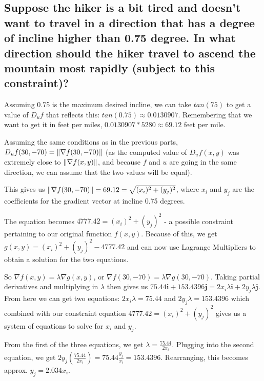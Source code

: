 \documentclass{article}
\begin{document}
\subsection{Suppose the hiker is a bit tired and doesn’t want to travel in a direction that has a degree of incline higher than 0.75 degree. In what direction should the hiker travel to ascend the mountain most rapidly (subject to this constraint)?}

\par\noindent\Large Assuming 0.75 is the maximum desired incline, we can take $tan(75)$ to get a value of $D_{u}f$ that reflects this: $tan(0.75) \approx 0.0130907$.  Remembering that we want to get it in feet per miles, $0.0130907 * 5280 \approx 69.12$ feet per mile.

\par\noindent\Large Assuming the same conditions as in the previous parts, $D_{u}f(30, -70) = \norm{\nabla f(30, -70)}$ (as the computed value of $D_{u}f(x, y)$ was extremely close to $\norm{\nabla f(x, y)}$, and because $f$ and $u$ are going in the same direction, we can assume that the two values will be equal).\vspace{0.25cm}

\par\noindent\Large This gives us $\norm{\nabla f(30, -70)} = 69.12 = \sqrt{(x_{i})^{2} + (y_{j})^{2}}$, where $x_{i}$ and $y_{j}$ are the coefficients for the gradient vector at incline 0.75 degrees.
\par\noindent\Large The equation becomes $4777.42 = (x_{i})^{2} + (y_{j})^{2}$ - a possible constraint pertaining to our original function $f(x, y)$.  Because of this, we get $g(x, y) = (x_{i})^{2} + (y_{j})^{2} - 4777.42$ and can now use Lagrange Multipliers to obtain a solution for the two equations.\vspace{0.25cm}

\par\noindent\Large So $\nabla f(x, y) = \lambda\nabla g(x, y)$, or $\nabla f(30, -70) = \lambda\nabla g(30, -70)$.  Taking partial derivatives and multiplying in $\lambda$ then gives us $75.44\textbf{i} + 153.4396\textbf{j} = 2x_{i}\lambda\textbf{i} + 2y_{j}\lambda\textbf{j}$.  From here we can get two equations: $2x_{i}\lambda = 75.44$ and $2y_{j}\lambda = 153.4396$ which combined with our constraint equation $4777.42 = (x_{i})^{2} + (y_{j})^{2}$ gives us a system of equations to solve for $x_{i}$ and $y_{j}$.\vspace{0.25cm}

\par\noindent\Large From the first of the three equations, we get $\lambda = \frac{75.44}{2x_{i}}$.  Plugging into the second equation, we get $2y_{j}(\frac{75.44}{2x_{i}}) = 75.44\frac{y_{j}}{x_{i}} = 153.4396$.  Rearranging, this becomes approx. $y_{j} = 2.034x_{i}$.\vspace{0.25cm}
\end{document}

